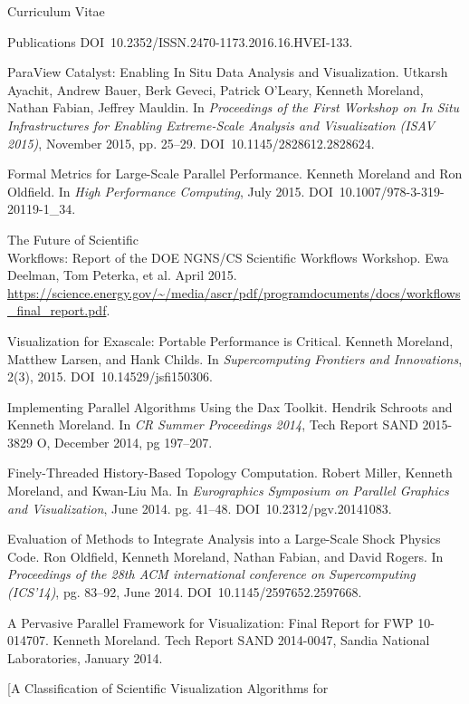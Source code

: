 \documentclass{article}
\begin{document}
\begin{cv}{Curriculum Vitae}
\begin{cvlist}{Publications}
      DOI~10.2352/ISSN.2470-1173.2016.16.HVEI-133.
    \item[ParaView Catalyst: Enabling In Situ Data Analysis and Visualization.]
      Utkarsh Ayachit, Andrew Bauer, Berk Geveci, Patrick O'Leary, Kenneth Moreland, Nathan Fabian, Jeffrey Mauldin.
      In \emph{Proceedings of the First Workshop on In Situ Infrastructures for Enabling Extreme-Scale Analysis and Visualization (ISAV 2015)}, November 2015, pp. 25--29.
      DOI~10.1145/2828612.2828624.
    \item[Formal Metrics for Large-Scale Parallel Performance.]
      Kenneth Moreland and Ron Oldfield.
      In \emph{High Performance Computing}, July 2015.
      DOI~10.1007/978-3-319-20119-1\_34.
    \item[The Future of Scientific]~\\ Workflows: Report of the DOE NGNS/CS Scientific Workflows Workshop.
      Ewa Deelman, Tom Peterka, et al.
      April 2015.
      \url{https://science.energy.gov/~/media/ascr/pdf/programdocuments/docs/workflows_final_report.pdf}.
    \item[Visualization for Exascale: Portable Performance is Critical.]
      Kenneth Moreland, Matthew Larsen, and Hank Childs.
      In \emph{Supercomputing Frontiers and Innovations}, 2(3), 2015.
      DOI~10.14529/jsfi150306.
    \item[Implementing Parallel Algorithms Using the Dax Toolkit.]
      Hendrik Schroots and Kenneth Moreland.
      In \emph{CR Summer Proceedings 2014}, Tech Report SAND 2015-3829 O, December 2014, pg 197--207.
    \item[Finely-Threaded History-Based Topology Computation.] Robert
      Miller, Kenneth Moreland, and Kwan-Liu Ma. In \emph{Eurographics
        Symposium on Parallel Graphics and Visualization}, June 2014. pg.
      41--48. DOI~10.2312/pgv.20141083.
    \item[Evaluation of Methods to Integrate Analysis into a Large-Scale
      Shock] Physics Code. Ron Oldfield, Kenneth Moreland, Nathan Fabian,
      and David Rogers. In \emph{Proceedings of the 28th ACM international
        conference on Supercomputing (ICS'14)}, pg. 83--92, June 2014.
      DOI~10.1145/2597652.2597668.
    \item[A Pervasive Parallel Framework for Visualization: Final Report
      for FWP] 10-014707. Kenneth Moreland. Tech Report SAND 2014-0047,
      Sandia National Laboratories, January 2014.
    \item[A Classification of Scientific Visualization Algorithms for

\end{cvlist}
\end{cv}
\end{document}
